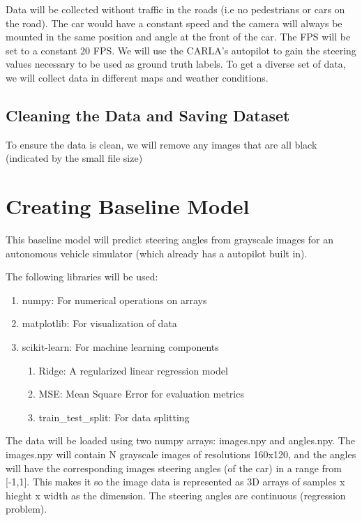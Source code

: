 \documentclass{article} %
\begin{document}
Data will  be collected without traffic in the roads (i.e
no pedestrians or cars on the road). The car would have a constant speed
and the camera will always be mounted in the same position and angle at
the front of the car. The FPS will be set to a constant 20 FPS.
We will use the CARLA's autopilot to gain the steering values necessary to be used as ground truth labels. To get a diverse
set of data, we will collect data in different maps and weather conditions.


\subsection{Cleaning the Data and Saving Dataset}

To ensure the data is clean, we will remove any images that are all black (indicated by the small file size)




 
\section{Creating Baseline Model}

This baseline model will predict steering angles from grayscale images for an autonomous
vehicle simulator (which already has a autopilot built in). 

The following libraries will be used:
\begin{enumerate}
  \item numpy: For numerical operations on arrays
  \item matplotlib: For visualization of data
  \item scikit-learn: For machine learning components
  \begin{enumerate}
    \item Ridge: A regularized linear regression model
    \item MSE: Mean Square Error for evaluation metrics
    \item train\_test\_split: For data splitting
  \end{enumerate}
\end{enumerate}

The data will be loaded using two numpy arrays: images.npy and angles.npy. The images.npy
will contain N grayscale images of resolutions 160x120, and the angles will have the corresponding
images steering angles (of the car) in a range from [-1,1]. This makes it so the image data is 
represented as 3D arrays of samples x hieght x width as the dimension. The steering angles are
continuous (regression problem). 
\end{document}
